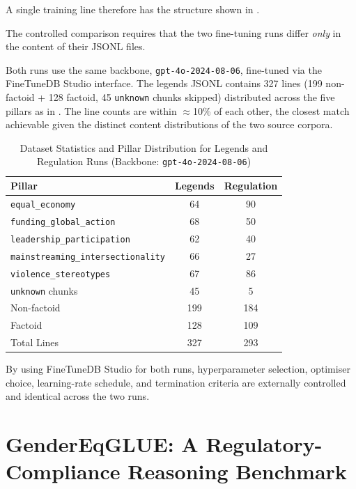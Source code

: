 \documentclass[pdflatex, sn-apa]{sn-jnl}%
\theoremstyle{thmstyleone}%
\theoremstyle{thmstyletwo}%
\theoremstyle{thmstylethree}%
\begin{document}
A single training line therefore has the structure shown in
.

The controlled comparison requires that the two fine-tuning runs differ
\emph{only} in the content of their JSONL files.

Both runs use the same backbone, \texttt{gpt-4o-2024-08-06}, fine-tuned via the
FineTuneDB Studio interface. The legends JSONL contains 327 lines (199
non-factoid + 128 factoid, 45 \texttt{unknown} chunks skipped) distributed
across the five pillars as in . The line counts are
within $\approx$10\% of each other, the closest match achievable given the
distinct content distributions of the two source corpora.


\begin{table}[htbp]
\centering
\caption{Dataset Statistics and Pillar Distribution for Legends and Regulation Runs (Backbone: \texttt{gpt-4o-2024-08-06})}
\label{tab:dataset_stats}
\begin{tabular}{@{}lcc@{}}
\toprule
\textbf{Pillar} & \textbf{Legends} & \textbf{Regulation} \\ \midrule
\texttt{equal\_economy} & 64 & 90 \\
\texttt{funding\_global\_action} & 68 & 50 \\
\texttt{leadership\_participation} & 62 & 40 \\
\texttt{mainstreaming\_intersectionality} & 66 & 27 \\
\texttt{violence\_stereotypes} & 67 & 86 \\ 
\texttt{unknown} chunks & 45 & 5 \\ \midrule
Non-factoid & 199 & 184 \\
Factoid & 128 & 109 \\ 
Total Lines & 327 & 293 \\ \bottomrule
\end{tabular}
\end{table}


By using FineTuneDB Studio for both runs, hyperparameter selection, optimiser
choice, learning-rate schedule, and termination criteria are externally
controlled and identical across the two runs. 

\FloatBarrier

\section{GenderEqGLUE: A Regulatory-Compliance Reasoning Benchmark}
\label{sec:benchmark}
\end{document}
